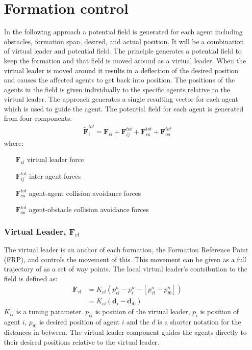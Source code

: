 \documentclass[a4paper,conference]{IEEEtran}
\begin{document}


\section{Formation control}
\label{sc:one-approach}
In the following approach a potential field is generated for each
agent including obstacles, formation span, desired, and actual
position.  It will be a combination of virtual leader and potential
field. The principle generates a potential field to keep the formation
and that field is moved around as a virtual leader. When the virtual
leader is moved around it results in a deflection of the desired
position and causes the affected agents to get back into position. The
positions of the agents in the field is given individually to the
specific agents relative to the virtual leader. The approach generates
a single resulting vector for each agent which is used to guide the
agent. The potential field for each agent is generated from four
components:
\begin{align}
\tilde{\mathbf{F}}_i^{tot} = \mathbf{F}_{vl}+\mathbf{F}_{ij}^{tot}+\mathbf{F}_{ca}^{tot}+\mathbf{F}_{oa}^{tot}
\end{align}
where:
\begin{itemize}
\item[$\mathbf{F}_{vl}$] virtual leader force
\item[$\mathbf{F}_{ij}^{tot}$] inter-agent forces
\item[$\mathbf{F}_{ca}^{tot}$] agent-agent collision avoidance forces
\item[$\mathbf{F}_{oa}^{tot}$] agent-obstacle collision avoidance forces
\end{itemize}

\subsubsection{Virtual Leader, $\mathbf{F}_{vl}$}
The virtual leader is an anchor of each formation, the Formation Reference Point (FRP), and
controls the movement of this. This movement can be given as a
full trajectory of as a set of way points. The local virtual leader's
contribution to the field is defined as:
\begin{align}
\mathbf{F}_{vl} &= K_{vl}(p_{vl}^n-p_i^n-[p_{vl}^n-p_{i0}^n])\\
&= K_{vl}(\mathbf{d}_i-\mathbf{d}_{i0})
\end{align}
$K_{vl}$ is a tuning parameter. $p_{vl}$ is position of the virtual
leader, $p_i$ is position of agent $i$, $p_{i0}$ is desired position
of agent $i$ and the $d$ is a shorter notation for the distances in
between. The virtual leader component guides the agents directly to
their desired positions relative to the virtual leader.
\end{document}
